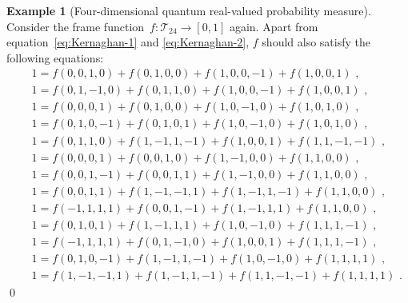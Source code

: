 \documentclass[reprint, aps, prl,superscriptaddress, showpacs,
showkeys]{revtex4-1}
\theoremstyle{plain}
\theoremstyle{definition}
\newtheorem{example}[thm]{Example}
\begin{document}
\begin{example}[Four-dimensional quantum real-valued probability
measure]\label{ex:four-dimensional-real-value}Consider the frame
function~$f:\mathcal{T}_{24}\rightarrow\left[0,1\right]$ again.
Apart from equation~\ref{eq:Kernaghan-1} and \ref{eq:Kernaghan-2},
$f$ should also satisfy the following equations: 
\begin{eqnarray}
& & 1 = f(0,0,1,0)+f(0,1,0,0)+f(1,0,0,-1)+f(1,0,0,1)\textrm{ ,}\\ 
& & 1 = f(0,1,-1,0)+f(0,1,1,0)+f(1,0,0,-1)+f(1,0,0,1)\textrm{ ,}\\ 
& & 1 = f(0,0,0,1)+f(0,1,0,0)+f(1,0,-1,0)+f(1,0,1,0)\textrm{ ,}\\ 
& & 1 = f(0,1,0,-1)+f(0,1,0,1)+f(1,0,-1,0)+f(1,0,1,0)\textrm{ ,}\\ 
& & 1 = f(0,1,1,0)+f(1,-1,1,-1)+f(1,0,0,1)+f(1,1,-1,-1)\textrm{ ,}\\ 
& & 1 = f(0,0,0,1)+f(0,0,1,0)+f(1,-1,0,0)+f(1,1,0,0)\textrm{ ,}\\ 
& & 1 = f(0,0,1,-1)+f(0,0,1,1)+f(1,-1,0,0)+f(1,1,0,0)\textrm{ ,}\\ 
& & 1 = f(0,0,1,1)+f(1,-1,-1,1)+f(1,-1,1,-1)+f(1,1,0,0)\textrm{ ,}\\ 
& & 1 = f(-1,1,1,1)+f(0,0,1,-1)+f(1,-1,1,1)+f(1,1,0,0)\textrm{ ,}\\ 
& & 1 = f(0,1,0,1)+f(1,-1,1,1)+f(1,0,-1,0)+f(1,1,1,-1)\textrm{ ,}\\ 
& & 1 = f(-1,1,1,1)+f(0,1,-1,0)+f(1,0,0,1)+f(1,1,1,-1)\textrm{ ,}\\ 
& & 1 = f(0,1,0,-1)+f(1,-1,1,-1)+f(1,0,-1,0)+f(1,1,1,1)\textrm{ ,}\\ 
& & 1 = f(1,-1,-1,1)+f(1,-1,1,-1)+f(1,1,-1,-1)+f(1,1,1,1)\textrm{ .} 
\label{eq:non-Kernaghan}\end{eqnarray}
\qed\end{example}
\end{document}
